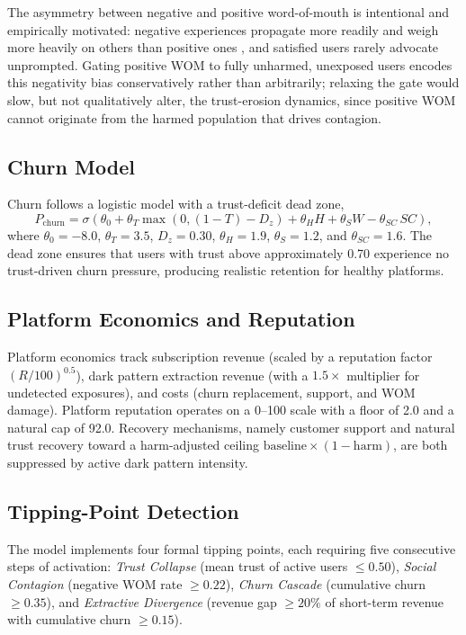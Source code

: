 \documentclass[a4paper]{article}
\begin{document}
The asymmetry between negative and positive word-of-mouth is intentional and empirically motivated: negative experiences propagate more readily and weigh more heavily on others than positive ones \citep{baumeister2001}, and satisfied users rarely advocate unprompted. Gating positive WOM to fully unharmed, unexposed users encodes this negativity bias conservatively rather than arbitrarily; relaxing the gate would slow, but not qualitatively alter, the trust-erosion dynamics, since positive WOM cannot originate from the harmed population that drives contagion.

\subsection{Churn Model}
Churn follows a logistic model with a trust-deficit dead zone,
\begin{equation}
P_{\text{churn}} = \sigma\!\left(\theta_0 + \theta_T \max(0, (1-T) - D_z) + \theta_H H + \theta_S W - \theta_{SC}\, SC\right),
\end{equation}
where $\theta_0 = -8.0$, $\theta_T = 3.5$, $D_z = 0.30$, $\theta_H = 1.9$, $\theta_S = 1.2$, and $\theta_{SC} = 1.6$. The dead zone ensures that users with trust above approximately 0.70 experience no trust-driven churn pressure, producing realistic retention for healthy platforms.

\subsection{Platform Economics and Reputation}
Platform economics track subscription revenue (scaled by a reputation factor $(R/100)^{0.5}$), dark pattern extraction revenue (with a $1.5\times$ multiplier for undetected exposures), and costs (churn replacement, support, and WOM damage). Platform reputation operates on a 0--100 scale with a floor of 2.0 and a natural cap of 92.0. Recovery mechanisms, namely customer support and natural trust recovery toward a harm-adjusted ceiling $\text{baseline}\times(1-\text{harm})$, are both suppressed by active dark pattern intensity.

\subsection{Tipping-Point Detection}
The model implements four formal tipping points, each requiring five consecutive steps of activation: \emph{Trust Collapse} (mean trust of active users $\le 0.50$), \emph{Social Contagion} (negative WOM rate $\ge 0.22$), \emph{Churn Cascade} (cumulative churn $\ge 0.35$), and \emph{Extractive Divergence} (revenue gap $\ge 20\%$ of short-term revenue with cumulative churn $\ge 0.15$).
\end{document}
